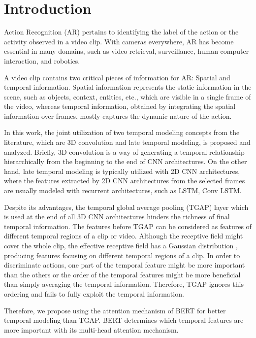 \documentclass[runningheads]{llncs}
\begin{document}
\section{Introduction}
Action Recognition (AR) pertains to identifying the label of the action or the activity observed in a video clip. With cameras everywhere, AR has become essential in many domains, such as video retrieval, surveillance, human-computer interaction, and robotics.

A video clip contains two critical pieces of information for AR: Spatial and temporal information. Spatial information represents the static information in the scene, such as objects, context, entities, etc., which are visible in a single frame of the video, whereas temporal information, obtained by integrating the spatial information over frames, mostly captures the dynamic nature of the action.

In this work, the joint utilization of two temporal modeling concepts from the literature, which are 3D convolution and late temporal modeling, is proposed and analyzed. Briefly, 3D convolution is a way of generating a temporal relationship hierarchically from the beginning to the end of CNN architectures. On the other hand, late temporal modeling is typically utilized with 2D CNN architectures, where the features extracted by 2D CNN architectures from the selected frames are usually modeled with recurrent architectures, such as LSTM, Conv LSTM. 

Despite its advantages, the temporal global average pooling (TGAP) layer which is used at the end of all 3D CNN architectures \cite{Carreira2017,Chen2018Multi-fiberRecognition,Feichtenhofer2019SlowfastRecognition,Hara2018,Piergiovanni2018EvolvingVideos,Tran2019VideoNetworks,Tran2018a,Xie2018} hinders the richness of final temporal information. The features before TGAP can be considered as features of different temporal regions of a clip or video. Although the receptive field might cover the whole clip, the effective receptive field has a Gaussian distribution \cite{Luo2017UnderstandingNetworks}, producing features focusing on different temporal regions of a clip. In order to discriminate actions, one part of the temporal feature might be more important than the others or the order of the temporal features might be more beneficial than simply averaging the temporal information. Therefore, TGAP ignores this ordering and fails to fully exploit the temporal information.

Therefore, we propose using the attention mechanism of BERT for better temporal modeling than TGAP. BERT determines which temporal features are more important with its multi-head attention mechanism.
\end{document}
